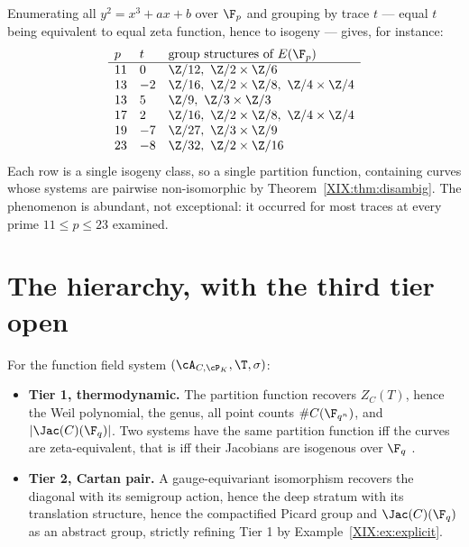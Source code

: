 \begin{example}\label{XIX:ex:explicit}
Enumerating all $y^2=x^3+ax+b$ over $\F_p$ and grouping by trace $t$ --- equal $t$ being
equivalent to equal zeta function, hence to isogeny \cite{Tate} --- gives, for instance:
\[
\begin{array}{lll}
p & t & \text{group structures of }E(\F_p)\\\hline
11 & 0 & \Z/12,\ \Z/2\times\Z/6\\
13 & -2 & \Z/16,\ \Z/2\times\Z/8,\ \Z/4\times\Z/4\\
13 & 5 & \Z/9,\ \Z/3\times\Z/3\\
17 & 2 & \Z/16,\ \Z/2\times\Z/8,\ \Z/4\times\Z/4\\
19 & -7 & \Z/27,\ \Z/3\times\Z/9\\
23 & -8 & \Z/32,\ \Z/2\times\Z/16
\end{array}
\]
Each row is a single isogeny class, so a single partition function, containing curves whose
systems are pairwise non-isomorphic by Theorem~\ref{XIX:thm:disambig}. The phenomenon is
abundant, not exceptional: it occurred for most traces at every prime $11\le p\le23$ examined.
\end{example}

\section{The hierarchy, with the third tier open}

\begin{theorem}\label{XIX:thm:tiers}
For the function field system $(\cA_{C,\cP_K},\T,\sigma)$:
\begin{itemize}
\item \textbf{Tier 1, thermodynamic.} The partition function recovers $Z_C(T)$, hence the
Weil polynomial, the genus, all point counts $\#C(\F_{q^n})$, and $|\Jac(C)(\F_q)|$. Two
systems have the same partition function iff the curves are zeta-equivalent, that is iff
their Jacobians are isogenous over $\F_q$ \cite{Tate}.
\item \textbf{Tier 2, Cartan pair.} A gauge-equivariant isomorphism recovers the diagonal
with its semigroup action, hence the deep stratum with its translation structure, hence the
compactified Picard group and $\Jac(C)(\F_q)$ as an abstract group, strictly refining Tier 1
by Example~\ref{XIX:ex:explicit}.
\end{itemize}
\end{theorem}

